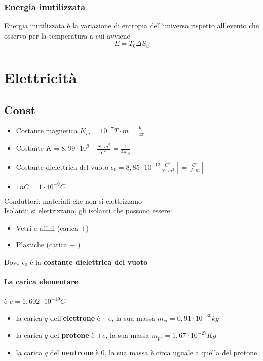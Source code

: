 \documentclass[a4paper]{report}
\begin{document}
  \subsection{Energia inutilizzata}
  Energia inutilizzata è la variazione di entropia dell'universo rispetto all'evento che osservo per la temperatura a cui avviene
  $$E = T_0 \Delta S_u$$


  \chapter{Elettricità}
  \section{Const}
  \begin{itemize}
    \item Costante magnetica $K_m = 10^{-7} T\cdot m = \frac{\mu_0}{4\pi}$
    \item Costante $K = 8,99 \cdot 10^9 \quad \frac{N\cdot m^2}{C^2} = \frac{1}{4\pi \epsilon_0}$
    \item Costante dielettrica del vuoto $\epsilon_0 = 8,85 \cdot 10^{-12} \frac{C^2}{N \cdot m^2} [= \frac{C^2}{J \cdot m}]$
    \item $1nC = 1 \cdot 10^{-9} C $
  \end{itemize}
  Conduttori: materiali che non si elettrizzano \\
  Isolanti: si elettrizzano, gli isolanti che possono essere:
  \begin{itemize}
    \item Vetri e affini (carica $+$)
    \item Plastiche (carica $-$ )
  \end{itemize}

  Dove $\epsilon_0$ è la \textbf{costante dielettrica del vuoto}
  \subsubsection{La carica elementare}
  è $e = 1,602 \cdot 10^{-19} C$
  \begin{itemize}
    \item la carica $q$ dell'\textbf{elettrone} è $-e$, la sua massa $m_{el} = 0,91 \cdot 10^{-30} kg$
    \item la carica $q$ del \textbf{protone} è $+e$, la sua massa $m_{pr} = 1,67 \cdot 10^{-27} Kg$
    \item la carica $q$ del \textbf{neutrone} è $0$, la sua massa è circa uguale a quella del protone
  \end{itemize}
\end{document}
